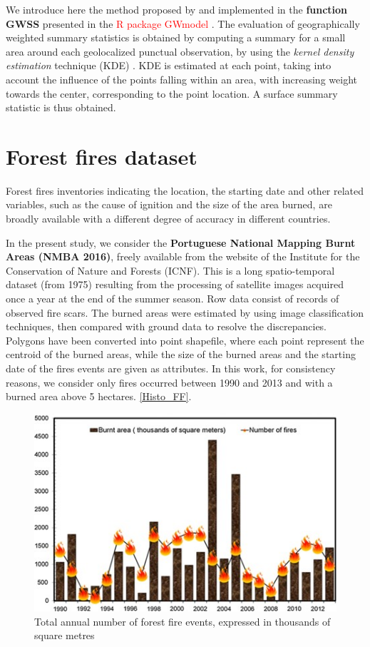 \documentclass[
]{book}
\theoremstyle{definition}
\theoremstyle{definition}
\theoremstyle{definition}
\theoremstyle{definition}
\theoremstyle{remark}
\begin{document}
We introduce here the method proposed by \citep{brunsdon_geographically_2002} and implemented in the \textbf{function GWSS} presented in the \textcolor{red} {R package GWmodel} \citep{lu_gwmodel_2014, brunsdon_rpubs_2019}.
The evaluation of geographically weighted summary statistics is obtained by computing a summary for a small area around each geolocalized punctual observation, by using the \emph{kernel density estimation} technique (KDE) \citep{brunsdon_estimating_1995}.
KDE is estimated at each point, taking into account the influence of the points falling within an area, with increasing weight towards the center, corresponding to the point location.
A surface summary statistic is thus obtained.

\hypertarget{forest-fires-dataset}{%
\section{Forest fires dataset}\label{forest-fires-dataset}}

Forest fires inventories indicating the location, the starting date and other related variables, such as the cause of ignition and the size of the area burned, are broadly available with a different degree of accuracy in different countries.

In the present study, we consider the \textbf{Portuguese National Mapping Burnt Areas (NMBA 2016)}, freely available from the website of the Institute for the Conservation of Nature and Forests (ICNF).
This is a long spatio-temporal dataset (from 1975) resulting from the processing of satellite images acquired once a year at the end of the summer season.
Row data consist of records of observed fire scars.
The burned areas were estimated by using image classification techniques, then compared with ground data to resolve the discrepancies.
Polygons have been converted into point shapefile, where each point represent the centroid of the burned areas, while the size of the burned areas and the starting date of the fires events are given as attributes.
In this work, for consistency reasons, we consider only fires occurred between 1990 and 2013 and with a burned area above 5 hectares.
\autoref{Histo_FF}.

\begin{figure}

{\centering \includegraphics[width=0.7\linewidth,height=0.7\textheight]{images/Histo_FF} 

}

\caption{Total annual number of forest fire events, expressed in thousands of square metres \label{Histo_FF}}\label{fig:jpg}
\end{figure}
\end{document}
